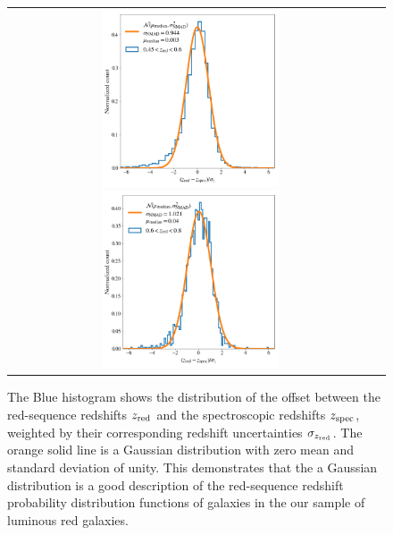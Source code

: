 \documentclass[fleqn,usenatbib,useAMS]{mnras}
\begin{document}
\begin{figure}
 \begin{tabular}{cc}
\includegraphics[width=0.5\textwidth]{figures_tmp/nz_normal_3.png}
\includegraphics[width=0.5\textwidth]{figures_tmp/nz_normal_4.png}
\end{tabular}
\caption{\label{fig:pz} The Blue histogram shows the distribution of the offset between the red-sequence redshifts $z_{\rm red}$ and the spectroscopic redshifts $z_{\rm spec}$, weighted by their corresponding redshift uncertainties $\sigma_{z_{\rm red}}$. The orange solid line is a Gaussian distribution with zero mean and standard deviation of unity. This demonstrates that the a Gaussian distribution is a good description of the red-sequence redshift probability distribution functions of galaxies in the our sample of luminous red galaxies.} 
\end{figure}


\end{document}
